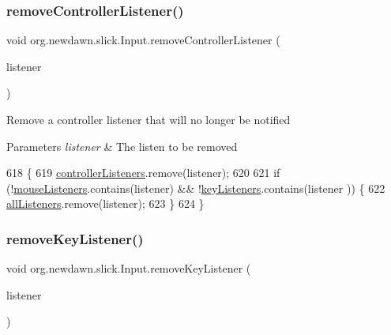 \subsubsection{\texorpdfstring{remove\+Controller\+Listener()}{removeControllerListener()}}
{\footnotesize\ttfamily void org.\+newdawn.\+slick.\+Input.\+remove\+Controller\+Listener (\begin{DoxyParamCaption}\item[{\mbox{\hyperlink{interfaceorg_1_1newdawn_1_1slick_1_1_controller_listener}{Controller\+Listener}}}]{listener }\end{DoxyParamCaption})\hspace{0.3cm}{\ttfamily [inline]}}

Remove a controller listener that will no longer be notified


\begin{DoxyParams}{Parameters}
{\em listener} & The listen to be removed \\
\hline
\end{DoxyParams}

\begin{DoxyCode}
618                                                                       \{
619         \mbox{\hyperlink{classorg_1_1newdawn_1_1slick_1_1_input_a762495b937bf0e42b5dbfaa29bdb1b98}{controllerListeners}}.remove(listener);
620         
621         \textcolor{keywordflow}{if} (!\mbox{\hyperlink{classorg_1_1newdawn_1_1slick_1_1_input_a14f9c58eb48c498073f11c6934d92998}{mouseListeners}}.contains(listener) && !\mbox{\hyperlink{classorg_1_1newdawn_1_1slick_1_1_input_a9a68e6a9e9441fea9793f57603be2f96}{keyListeners}}.contains(listener
      )) \{
622             \mbox{\hyperlink{classorg_1_1newdawn_1_1slick_1_1_input_a26d5ed77d8b0444118d630336d0ab6d7}{allListeners}}.remove(listener);
623         \}
624     \}
\end{DoxyCode}
\mbox{\label{classorg_1_1newdawn_1_1slick_1_1_input_ae57dc0f6e6f76b1865912bf556e9cc8f}} 
\subsubsection{\texorpdfstring{remove\+Key\+Listener()}{removeKeyListener()}}
{\footnotesize\ttfamily void org.\+newdawn.\+slick.\+Input.\+remove\+Key\+Listener (\begin{DoxyParamCaption}\item[{\mbox{\hyperlink{interfaceorg_1_1newdawn_1_1slick_1_1_key_listener}{Key\+Listener}}}]{listener }\end{DoxyParamCaption})\hspace{0.3cm}{\ttfamily [inline]}}

